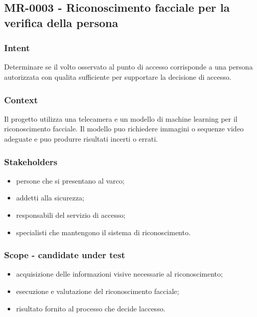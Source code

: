 \documentclass[
  10pt,
]{article}
\providecommand{\tightlist}{%
  \setlength{\itemsep}{0pt}\setlength{\parskip}{0pt}}
\begin{document}
\subsection{MR-0003 - Riconoscimento facciale per la verifica della
persona}\label{mr-0003---riconoscimento-facciale-per-la-verifica-della-persona}

\subsubsection{Intent}\label{intent-2}

Determinare se il volto osservato al punto di accesso corrisponde a una
persona autorizzata con qualita sufficiente per supportare la decisione
di accesso.

\subsubsection{Context}\label{context-2}

Il progetto utilizza una telecamera e un modello di machine learning per
il riconoscimento facciale. Il modello puo richiedere immagini o
sequenze video adeguate e puo produrre risultati incerti o errati.

\subsubsection{Stakeholders}\label{stakeholders-2}

\begin{itemize}
\tightlist
\item
  persone che si presentano al varco;
\item
  addetti alla sicurezza;
\item
  responsabili del servizio di accesso;
\item
  specialisti che mantengono il sistema di riconoscimento.
\end{itemize}

\subsubsection{Scope - candidate under
test}\label{scope---candidate-under-test-2}

\begin{itemize}
\tightlist
\item
  acquisizione delle informazioni visive necessarie al riconoscimento;
\item
  esecuzione e valutazione del riconoscimento facciale;
\item
  risultato fornito al processo che decide l\textquotesingle accesso.
\end{itemize}
\end{document}
